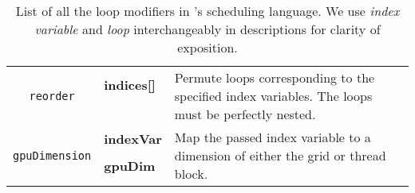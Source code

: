 \begin{table}[htb]
{\begin{tabularx}{\linewidth}{c | l | l}
   \midrule
   \multirow{4}{*}{\texttt{reorder}} & \textbf{indices[]}  & \multirow{4}{*}{\parbox{0.55\linewidth}{Permute loops corresponding to the specified index variables.
   The loops must be perfectly nested.}} \\
                                               &   & \\
                                               &   &  \\
                                               &   &  \\
   \midrule
   \multirow{3}{*}{\texttt{gpuDimension}} & \textbf{indexVar}  & \multirow{3}{*}{\parbox{0.55\linewidth}{Map the passed index variable to a dimension of either the grid
   or thread block.}} \\
                                               & \textbf{gpuDim}  & \\
                                               &   &  \\

  \bottomrule
  \end{tabularx}
  }
  \vskip 5pt
  \caption{\label{Tab:LoopModifiers} List of all the loop modifiers in \Treebeard{}'s scheduling language. We use \emph{index variable}
  and \emph{loop} interchangeably in descriptions for clarity of exposition.}
\end{table}




